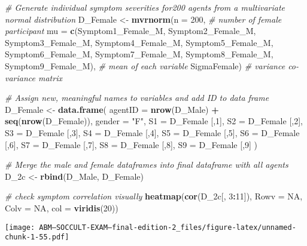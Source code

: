 \documentclass[]{article}
\newenvironment{Shaded}{\begin{snugshade}}{\end{snugshade}}
\newcommand{\KeywordTok}[1]{\textcolor[rgb]{0.13,0.29,0.53}{\textbf{#1}}}
\newcommand{\DataTypeTok}[1]{\textcolor[rgb]{0.13,0.29,0.53}{#1}}
\newcommand{\DecValTok}[1]{\textcolor[rgb]{0.00,0.00,0.81}{#1}}
\newcommand{\StringTok}[1]{\textcolor[rgb]{0.31,0.60,0.02}{#1}}
\newcommand{\CommentTok}[1]{\textcolor[rgb]{0.56,0.35,0.01}{\textit{#1}}}
\newcommand{\OtherTok}[1]{\textcolor[rgb]{0.56,0.35,0.01}{#1}}
\newcommand{\OperatorTok}[1]{\textcolor[rgb]{0.81,0.36,0.00}{\textbf{#1}}}
\newcommand{\NormalTok}[1]{#1}
\begin{document}
\begin{Shaded}
\begin{Highlighting}[]
\CommentTok{# Generate individual symptom severities for200 agents from a multivariate normal distribution}
\NormalTok{D_Female <-}\StringTok{ }\KeywordTok{mvrnorm}\NormalTok{(}\DataTypeTok{n =} \DecValTok{200}\NormalTok{, }\CommentTok{# number of female participant}
                    \DataTypeTok{mu =} \KeywordTok{c}\NormalTok{(Symptom1_Female_M, Symptom2_Female_M, Symptom3_Female_M, Symptom4_Female_M, Symptom5_Female_M, Symptom6_Female_M, Symptom7_Female_M, Symptom8_Female_M, Symptom9_Female_M), }\CommentTok{# mean of each variable}
\NormalTok{                    SigmaFemale) }\CommentTok{# variance co-variance matrix}

\CommentTok{# Assign new, meaningful names to variables and add ID to data frame}
\NormalTok{D_Female <-}\StringTok{ }\KeywordTok{data.frame}\NormalTok{(}
  \DataTypeTok{agentID =} \KeywordTok{nrow}\NormalTok{(D_Male) }\OperatorTok{+}\StringTok{ }\KeywordTok{seq}\NormalTok{(}\KeywordTok{nrow}\NormalTok{(D_Female)),}
  \DataTypeTok{gender =} \StringTok{"F"}\NormalTok{,}
  \DataTypeTok{S1 =}\NormalTok{ D_Female [,}\DecValTok{1}\NormalTok{],}
  \DataTypeTok{S2 =}\NormalTok{  D_Female [,}\DecValTok{2}\NormalTok{],}
  \DataTypeTok{S3 =}\NormalTok{  D_Female [,}\DecValTok{3}\NormalTok{],}
  \DataTypeTok{S4 =}\NormalTok{ D_Female [,}\DecValTok{4}\NormalTok{],}
  \DataTypeTok{S5 =}\NormalTok{ D_Female [,}\DecValTok{5}\NormalTok{],}
  \DataTypeTok{S6 =}\NormalTok{  D_Female [,}\DecValTok{6}\NormalTok{],}
  \DataTypeTok{S7 =}\NormalTok{  D_Female [,}\DecValTok{7}\NormalTok{],}
  \DataTypeTok{S8 =}\NormalTok{ D_Female [,}\DecValTok{8}\NormalTok{],}
  \DataTypeTok{S9 =}\NormalTok{ D_Female [,}\DecValTok{9}\NormalTok{]}
\NormalTok{)}


\CommentTok{# Merge the male and female dataframes into final dataframe with all agents}
\NormalTok{D_2c <-}\StringTok{ }\KeywordTok{rbind}\NormalTok{(D_Male, D_Female)}

\CommentTok{# check symptom correlation visually}
\KeywordTok{heatmap}\NormalTok{(}\KeywordTok{cor}\NormalTok{(D_2c[, }\DecValTok{3}\OperatorTok{:}\DecValTok{11}\NormalTok{]), }\DataTypeTok{Rowv =} \OtherTok{NA}\NormalTok{, }\DataTypeTok{Colv =} \OtherTok{NA}\NormalTok{, }\DataTypeTok{col =} \KeywordTok{viridis}\NormalTok{(}\DecValTok{20}\NormalTok{))}
\end{Highlighting}
\end{Shaded}

\texttt{[image: ABM---SOCCULT-EXAM---final-edition-2\_files/figure-latex/unnamed-chunk-1-55.pdf]}
\end{document}
